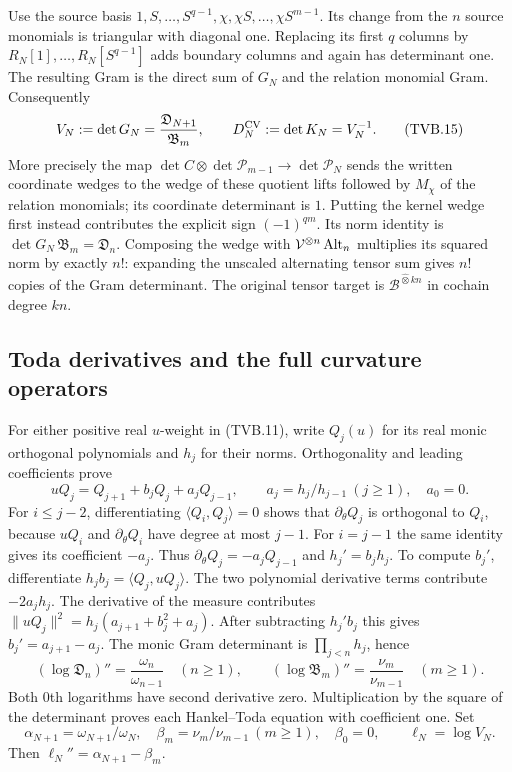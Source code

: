 Use the source basis
$1,S,\ldots,S^{q-1},\chi,\chi S,\ldots,\chi S^{m-1}$.
Its change from the $n$ source monomials is triangular with
diagonal one. Replacing its first $q$ columns by $R_N[1],
\ldots,R_N[S^{q-1}]$ adds boundary columns and again has
determinant one. The resulting Gram is the direct sum of $G_N$
and the relation monomial Gram. Consequently
\[
 V_N:=\det G_N=\frac{\mathfrak D_{N+1}}{\mathfrak B_m},
 \qquad D_N^{\rm CV}:=\det K_N=V_N^{-1}.
 \tag{TVB.15}
\]
More precisely the map
$\det C\otimes\det\mathcal P_{m-1}\to\det\mathcal P_N$
sends the written coordinate wedges to the wedge of these quotient
lifts followed by $M_\chi$ of the relation monomials; its coordinate
determinant is $1$. Putting the kernel wedge first instead contributes
the explicit sign $(-1)^{qm}$. Its norm identity is
$\det G_N\,\mathfrak B_m=\mathfrak D_n$.
Composing the wedge with $\mathcal V^{\otimes n}\operatorname{Alt}_n$
multiplies its squared norm by exactly $n!$: expanding the unscaled
alternating tensor sum gives $n!$ copies of the Gram determinant.
The original tensor target is $\mathscr B^{\widehat\otimes kn}$
in cochain degree $kn$.

\subsection{Toda derivatives and the full curvature operators}

For either positive real $u$-weight in (TVB.11), write $Q_j(u)$
for its real monic orthogonal polynomials and $h_j$ for their
norms. Orthogonality and leading coefficients prove
\[
 uQ_j=Q_{j+1}+b_jQ_j+a_jQ_{j-1},\qquad
 a_j=h_j/h_{j-1}\ (j\ge1),\quad a_0=0.
\]
For $i\le j-2$, differentiating $\langle Q_i,Q_j\rangle=0$
shows that $\partial_\theta Q_j$ is orthogonal to $Q_i$, because
$uQ_i$ and $\partial_\theta Q_i$ have degree at most $j-1$.
For $i=j-1$ the same identity gives its coefficient $-a_j$.
Thus $\partial_\theta Q_j=-a_jQ_{j-1}$ and $h_j'=b_jh_j$.
To compute $b_j'$, differentiate $h_jb_j=\langle Q_j,uQ_j\rangle$.
The two polynomial derivative terms contribute $-2a_jh_j$.
The derivative of the measure contributes
$\|uQ_j\|^2=h_j(a_{j+1}+b_j^2+a_j)$.
After subtracting $h_j'b_j$ this gives $b_j'=a_{j+1}-a_j$.
The monic Gram determinant is $\prod_{j<n}h_j$, hence
\[
 (\log\mathfrak D_n)''
 =\frac{\omega_n}{\omega_{n-1}}\quad(n\ge1),\qquad
 (\log\mathfrak B_m)''=\frac{\nu_m}{\nu_{m-1}}\quad(m\ge1).
 \tag{TVB.16}
\]
Both $0$th logarithms have second derivative zero.
Multiplication by the square of the determinant proves each
Hankel--Toda equation with coefficient one.
Set
\[
 \alpha_{N+1}=\omega_{N+1}/\omega_N,\quad
 \beta_m=\nu_m/\nu_{m-1}\ (m\ge1),\quad\beta_0=0,
 \qquad\ell_N=\log V_N.
\]
Then $\ell_N''=\alpha_{N+1}-\beta_m$.

